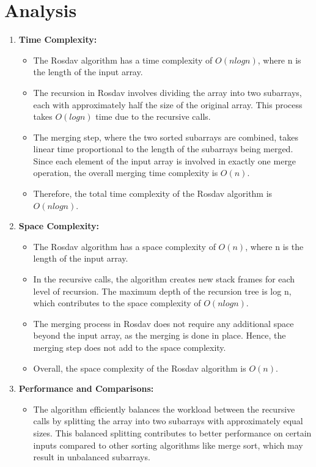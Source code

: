 \documentclass[12pt]{article}
\begin{document}
\section{Analysis}
\begin{enumerate}

\item \textbf{Time Complexity: }
\begin{itemize}
   \item The Rosdav algorithm has a time complexity of $O(n log n)$, where n is the length of the input array.
   \item The recursion in Rosdav involves dividing the array into two subarrays, each with approximately half the size of the original array. This process takes $O(log n)$ time due to the recursive calls.
   \item  The merging step, where the two sorted subarrays are combined, takes linear time proportional to the length of the subarrays being merged. Since each element of the input array is involved in exactly one merge operation, the overall merging time complexity is $O(n)$.
   \item  Therefore, the total time complexity of the Rosdav algorithm is $O(n log n)$.
\end{itemize}

\item \textbf{Space Complexity:} 
\begin{itemize}
   \item The Rosdav algorithm has a space complexity of $O(n)$, where n is the length of the input array.
   \item In the recursive calls, the algorithm creates new stack frames for each level of recursion. The maximum depth of the recursion tree is log n, which contributes to the space complexity of $O(n log n)$.
   \item The merging process in Rosdav does not require any additional space beyond the input array, as the merging is done in place. Hence, the merging step does not add to the space complexity.
   \item Overall, the space complexity of the Rosdav algorithm is $O(n)$.
\end{itemize}

\item \textbf{Performance and Comparisons:} 
\begin{itemize}

   
   \item The algorithm efficiently balances the workload between the recursive calls by splitting the array into two subarrays with approximately equal sizes. This balanced splitting contributes to better performance on certain inputs compared to other sorting algorithms like merge sort, which may result in unbalanced subarrays.
   

\end{itemize}
\end{enumerate}
\end{document}
